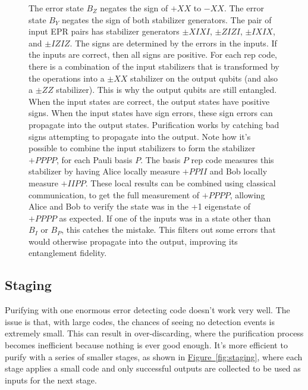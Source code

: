 \documentclass[onecolumn,unpublished,a4paper]{quantumarticle}
\theoremstyle{definition}
\theoremstyle{definition}
\theoremstyle{definition}
\newcommand{\fig}[1]{\hyperref[fig:#1]{Figure~\ref*{fig:#1}}}
\begin{document}
\begin{figure}
{        The error state $B_Z$ negates the sign of $+XX$ to $-XX$.
        The error state $B_Y$ negates the sign of both stabilizer generators.
        The pair of input EPR pairs has stabilizer generators $\pm XIXI$, $\pm ZIZI$, $\pm IXIX$, and $\pm IZIZ$.
        The signs are determined by the errors in the inputs.
        If the inputs are correct, then all signs are positive.
        For each rep code, there is a combination of the input stabilizers that is transformed by the operations into a $\pm XX$ stabilizer on the output qubits (and also a $\pm ZZ$ stabilizer).
        This is why the output qubits are still entangled.
        When the input states are correct, the output states have positive signs.
        When the input states have sign errors, these sign errors can propagate into the output states.
        Purification works by catching bad signs attempting to propagate into the output.
        Note how it's possible to combine the input stabilizers to form the stabilizer $+PPPP$, for each Pauli basis $P$.
        The basis $P$ rep code measures this stabilizer by having Alice locally measure $+PPII$ and Bob locally measure $+IIPP$.
        These local results can be combined using classical communication, to get the full measurement of $+PPPP$, allowing Alice and Bob to verify the state was in the +1 eigenstate of $+PPPP$ as expected.
        If one of the inputs was in a state other than $B_I$ or $B_P$, this catches the mistake.
        This filters out some errors that would otherwise propagate into the output, improving its entanglement fidelity.
    }
    \label{fig:distill_stabilizers}
\end{figure}

\subsection{Staging}

Purifying with one enormous error detecting code doesn't work very well.
The issue is that, with large codes, the chances of seeing no detection events is extremely small.
This can result in over-discarding, where the purification process becomes inefficient because nothing is ever good enough.
It's more efficient to purify with a series of smaller stages, as shown in \fig{staging}, where each stage applies a small code and only successful outputs are collected to be used as inputs for the next stage.
\end{document}
